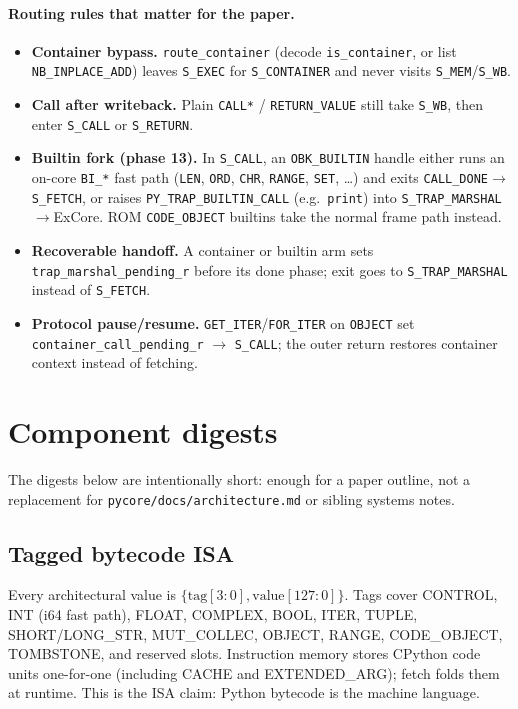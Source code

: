 \documentclass[11pt,a4paper]{article}
\begin{document}
\paragraph{Routing rules that matter for the paper.}
\begin{itemize}[leftmargin=1.2em,itemsep=0.2em]
  \item \textbf{Container bypass.}
        \texttt{route\_container} (decode \texttt{is\_container}, or list
        \texttt{NB\_INPLACE\_ADD}) leaves \texttt{S\_EXEC} for
        \texttt{S\_CONTAINER} and never visits \texttt{S\_MEM}/\texttt{S\_WB}.
  \item \textbf{Call after writeback.}
        Plain \texttt{CALL*} / \texttt{RETURN\_VALUE} still take
        \texttt{S\_WB}, then enter \texttt{S\_CALL} or \texttt{S\_RETURN}.
  \item \textbf{Builtin fork (phase 13).}
        In \texttt{S\_CALL}, an \texttt{OBK\_BUILTIN} handle either runs an
        on-core \texttt{BI\_*} fast path (\texttt{LEN}, \texttt{ORD},
        \texttt{CHR}, \texttt{RANGE}, \texttt{SET}, \ldots) and exits
        \texttt{CALL\_DONE}$\to$\texttt{S\_FETCH}, or raises
        \texttt{PY\_TRAP\_BUILTIN\_CALL} (e.g.\ \texttt{print}) into
        \texttt{S\_TRAP\_MARSHAL}$\to$ExCore.
        ROM \texttt{CODE\_OBJECT} builtins take the normal frame path instead.
  \item \textbf{Recoverable handoff.}
        A container or builtin arm sets \texttt{trap\_marshal\_pending\_r}
        before its done phase; exit goes to \texttt{S\_TRAP\_MARSHAL} instead
        of \texttt{S\_FETCH}.
  \item \textbf{Protocol pause/resume.}
        \texttt{GET\_ITER}/\texttt{FOR\_ITER} on \texttt{OBJECT} set
        \texttt{container\_call\_pending\_r} $\to$ \texttt{S\_CALL}; the outer
        return restores container context instead of fetching.
\end{itemize}

\section{Component digests}

The digests below are intentionally short: enough for a paper outline, not a
replacement for \texttt{pycore/docs/architecture.md} or sibling systems notes.

\subsection{Tagged bytecode ISA}
Every architectural value is $\{\mathrm{tag}[3{:}0],\mathrm{value}[127{:}0]\}$.
Tags cover CONTROL, INT (i64 fast path), FLOAT, COMPLEX, BOOL, ITER, TUPLE,
SHORT/LONG\_STR, MUT\_COLLEC, OBJECT, RANGE, CODE\_OBJECT, TOMBSTONE, and
reserved slots.
Instruction memory stores CPython code units one-for-one (including CACHE and
EXTENDED\_ARG); fetch folds them at runtime.
This is the ISA claim: Python bytecode is the machine language.
\end{document}

